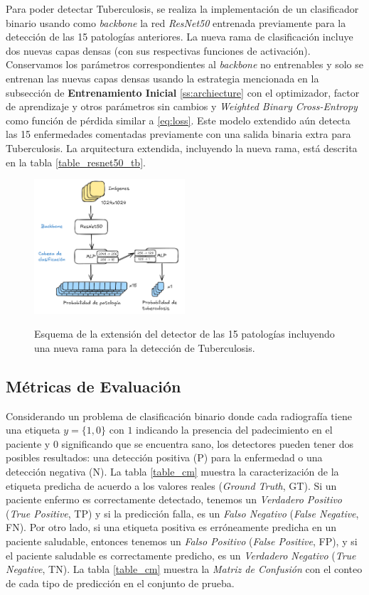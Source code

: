 Para poder detectar Tuberculosis, se realiza la implementación de un clasificador binario usando como
\textit{backbone} la red \textit{ResNet50} entrenada previamente para la detección de las 15 patologías
anteriores. La nueva rama de clasificación incluye dos nuevas capas densas (con sus respectivas funciones
de activación). Conservamos los parámetros correspondientes al \textit{backbone} no entrenables y solo se
entrenan las nuevas capas densas usando la estrategia mencionada en la subsección de {\bf Entrenamiento
Inicial} \ref{ss:archiecture} con el optimizador, factor de aprendizaje y otros parámetros sin cambios y
\textit{Weighted Binary Cross-Entropy} como función de pérdida similar a \eqref{eq:loss}. Este modelo
extendido aún detecta las 15 enfermedades comentadas previamente con una salida binaria extra para
Tuberculosis. La arquitectura extendida, incluyendo la nueva rama, está descrita en la tabla
\ref{table_resnet50_tb}.


\begin{figure}[htp]
    \centering
    {\includegraphics[width=0.5\textwidth]{Chapters/4. ViT-Lung/images/tb_net.png}}
\caption{ Esquema de la extensión del detector de las 15 patologías incluyendo una nueva rama para
          la detección de Tuberculosis.}
\label{net_tb}
\end{figure}


\subsection{Métricas de Evaluación} \label{sec_metrics}

Considerando un problema de clasificación binario donde cada radiografía tiene una etiqueta
$y = \{1, 0\}$ con $1$ indicando la presencia del padecimiento en el paciente y $0$ significando
que se encuentra sano, los detectores pueden tener dos posibles resultados: una detección positiva (P)
para la enfermedad o una detección negativa (N). La tabla \ref{table_cm} muestra la caracterización
de la etiqueta predicha de acuerdo a los valores reales (\textit{Ground Truth}, GT). Si un paciente
enfermo es correctamente detectado, tenemos un \textit{Verdadero Positivo} (\textit{True Positive}, TP)
y si la predicción falla, es un \textit{Falso Negativo} (\textit{False Negative}, FN). Por otro lado,
si una etiqueta positiva es erróneamente predicha en un paciente saludable, entonces tenemos un
\textit{Falso Positivo} (\textit{False Positive}, FP), y si el paciente saludable es correctamente
predicho, es un \textit{Verdadero Negativo} (\textit{True Negative}, TN). La tabla \ref{table_cm}
muestra la \textit{Matriz de Confusión} con el conteo de cada tipo de predicción en el conjunto de
prueba.


